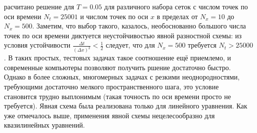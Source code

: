 расчитано решение для $T = 0.05$ для различного набора сеток с числом точек по оси времени $N_t = 25001$ и числом точек по оси $x$ в пределах от $N_x = 10$ до $N_x = 500$.
Заметим, что выбор такого, казалось, необоснованно большого числа точек по оси времени диктуется неустойчивостью явной разностной схемы: из условия устойчивости $\frac{\Delta t}{(\Delta x)^2} < \frac{1}{2}$ следует, что для $N_x = 500$ требуется $N_t > 25000$.
В таких простых, тестовых задачах такое соотношение ещё приемлемо, и современные компьютеры позволяют получить ршение достаточно быстро.
Однако в более сложных, многомерных задачах с резкими неоднородностями, требующими достаточно мелкого пространственного шага, это условие становится трудно выплонимым (такая точность по оси времени просто не требуется).
Явная схема была реализована только для линейного уравнения.
Как уже отмечалось выше, применения явной схемы нецелесообразно для квазилинейных уравнений.

